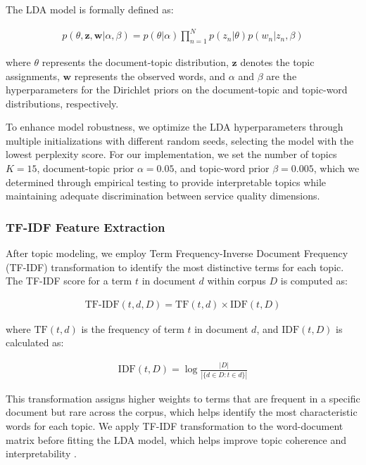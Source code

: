 \documentclass[a4paper,fleqn,12pt]{cas-sc}
\begin{document}
The LDA model is formally defined as:

\begin{align}
p(\theta, \mathbf{z}, \mathbf{w} | \alpha, \beta) = p(\theta | \alpha) \prod_{n=1}^{N} p(z_n | \theta) p(w_n | z_n, \beta)
\end{align}

where $\theta$ represents the document-topic distribution, $\mathbf{z}$ denotes the topic assignments, $\mathbf{w}$ represents the observed words, and $\alpha$ and $\beta$ are the hyperparameters for the Dirichlet priors on the document-topic and topic-word distributions, respectively.

To enhance model robustness, we optimize the LDA hyperparameters through multiple initializations with different random seeds, selecting the model with the lowest perplexity score. For our implementation, we set the number of topics $K = 15$, document-topic prior $\alpha = 0.05$, and topic-word prior $\beta = 0.005$, which we determined through empirical testing to provide interpretable topics while maintaining adequate discrimination between service quality dimensions.

\subsubsection{TF-IDF Feature Extraction}

After topic modeling, we employ Term Frequency-Inverse Document Frequency (TF-IDF) transformation to identify the most distinctive terms for each topic. The TF-IDF score for a term $t$ in document $d$ within corpus $D$ is computed as:

\begin{align}
\text{TF-IDF}(t, d, D) = \text{TF}(t, d) \times \text{IDF}(t, D)
\end{align}

where $\text{TF}(t, d)$ is the frequency of term $t$ in document $d$, and $\text{IDF}(t, D)$ is calculated as:

\begin{align}
\text{IDF}(t, D) = \log\frac{|D|}{|\{d \in D: t \in d\}|}
\end{align}

This transformation assigns higher weights to terms that are frequent in a specific document but rare across the corpus, which helps identify the most characteristic words for each topic. We apply TF-IDF transformation to the word-document matrix before fitting the LDA model, which helps improve topic coherence and interpretability \citep{ming2014understanding}.
\end{document}

